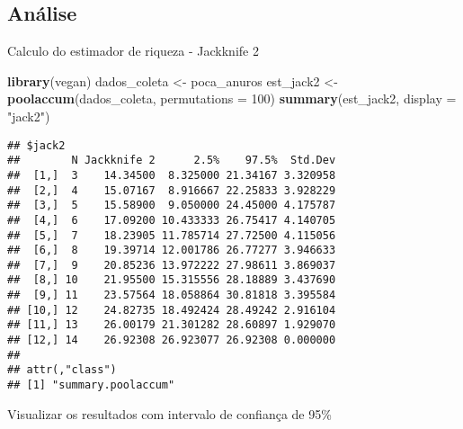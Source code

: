 \documentclass[
]{book}
\newenvironment{Shaded}{\begin{snugshade}}{\end{snugshade}}
\newcommand{\DataTypeTok}[1]{\textcolor[rgb]{0.13,0.29,0.53}{#1}}
\newcommand{\DecValTok}[1]{\textcolor[rgb]{0.00,0.00,0.81}{#1}}
\newcommand{\KeywordTok}[1]{\textcolor[rgb]{0.13,0.29,0.53}{\textbf{#1}}}
\newcommand{\NormalTok}[1]{#1}
\newcommand{\StringTok}[1]{\textcolor[rgb]{0.31,0.60,0.02}{#1}}
\begin{document}
\hypertarget{anuxe1lise-4}{%
\subsection{Análise}\label{anuxe1lise-4}}

Calculo do estimador de riqueza - Jackknife 2

\begin{Shaded}
\begin{Highlighting}[]
\KeywordTok{library}\NormalTok{(vegan)}
\NormalTok{dados_coleta <-}\StringTok{ }\NormalTok{poca_anuros}
\NormalTok{est_jack2 <-}\StringTok{ }\KeywordTok{poolaccum}\NormalTok{(dados_coleta, }\DataTypeTok{permutations =} \DecValTok{100}\NormalTok{)}
\KeywordTok{summary}\NormalTok{(est_jack2, }\DataTypeTok{display =} \StringTok{"jack2"}\NormalTok{)}
\end{Highlighting}
\end{Shaded}

\begin{verbatim}
## $jack2
##        N Jackknife 2      2.5%    97.5%  Std.Dev
##  [1,]  3    14.34500  8.325000 21.34167 3.320958
##  [2,]  4    15.07167  8.916667 22.25833 3.928229
##  [3,]  5    15.58900  9.050000 24.45000 4.175787
##  [4,]  6    17.09200 10.433333 26.75417 4.140705
##  [5,]  7    18.23905 11.785714 27.72500 4.115056
##  [6,]  8    19.39714 12.001786 26.77277 3.946633
##  [7,]  9    20.85236 13.972222 27.98611 3.869037
##  [8,] 10    21.95500 15.315556 28.18889 3.437690
##  [9,] 11    23.57564 18.058864 30.81818 3.395584
## [10,] 12    24.82735 18.492424 28.49242 2.916104
## [11,] 13    26.00179 21.301282 28.60897 1.929070
## [12,] 14    26.92308 26.923077 26.92308 0.000000
## 
## attr(,"class")
## [1] "summary.poolaccum"
\end{verbatim}

Visualizar os resultados com intervalo de confiança de 95\%
\end{document}
